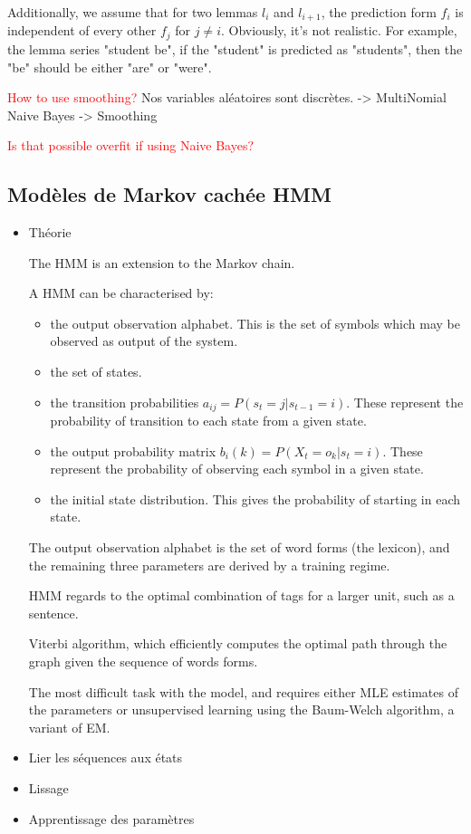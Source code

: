 \documentclass[a4paper]{article}
\begin{document}
Additionally, we assume that for two lemmas $l_i$ and $l_{i+1}$, the prediction form $f_{i}$ is independent of every other $f_{j}$ for $j \neq i$. Obviously, it's not realistic. For example, the lemma series "student be", if the "student" is predicted as "students", then the "be" should be either "are" or "were". 



\textcolor{red}{How to use smoothing?}
{ Nos variables aléatoires sont discrètes. -> MultiNomial Naive Bayes -> Smoothing}

\textcolor{red}{Is that possible overfit if using Naive Bayes?}

\subsection{Modèles de Markov cachée HMM}
\begin{itemize}
\item Théorie

The HMM is an extension to the Markov chain.



A HMM can be characterised by:
\begin{itemize}
\item the output observation alphabet. This is the set of symbols which may be observed as output of the system.
\item the set of states.
\item the transition probabilities $a_{ij} = P(s_t = j | s_{t-1} = i)$. These represent the probability of transition to each state from a given state.
\item the output probability matrix $b_i(k) = P(X_t = o_k | s_t = i)$. These represent the probability of observing each symbol in a given state.
\item the initial state distribution. This gives the probability of starting in each state.
\end{itemize}

The output observation alphabet is the set of word forms (the lexicon), and the 
remaining three parameters are derived by a training regime.

HMM regards to the optimal combination of tags for a larger unit, such as a sentence.

Viterbi algorithm, which efficiently computes the optimal path through the graph given the sequence of words forms.

The most difficult task with the model, and requires either MLE estimates of the parameters or unsupervised learning using the Baum-Welch algorithm, a variant of EM.


\item Lier les séquences aux états
\item Lissage
\item Apprentissage des paramètres
\end{itemize}
\end{document}

